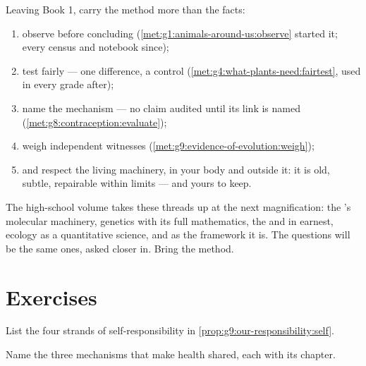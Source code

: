 \begin{method}\label{met:g9:our-responsibility:method}
Leaving Book 1, carry the method more than the facts:
\begin{enumerate}
  \item observe before concluding
        (\cref{met:g1:animals-around-us:observe} started
        it; every census and notebook since);
  \item test fairly --- one difference, a control
        (\cref{met:g4:what-plants-need:fairtest}, used in
        every grade after);
  \item name the mechanism --- no claim audited until its
        link is named
        (\cref{met:g8:contraception:evaluate});
  \item weigh independent witnesses
        (\cref{met:g9:evidence-of-evolution:weigh});
  \item and respect the living machinery, in your body
        and outside it: it is old, subtle, repairable
        within limits --- and yours to keep.
\end{enumerate}
\end{method}

\begin{remark}\label{rem:g9:our-responsibility:next}
The high-school volume takes these threads up at the next
magnification: the 's molecular machinery, genetics
with its full mathematics, the  and 
in earnest, ecology as a quantitative science, and
 as the framework it is. The questions will be
the same ones, asked closer in. Bring the method.
\end{remark}

\section{Exercises}

\begin{exercise}[$\star$]\label{exo:g9:our-responsibility:1}
List the four strands of self-responsibility in
\cref{prop:g9:our-responsibility:self}.
\end{exercise}

\begin{exercise}[$\star$]\label{exo:g9:our-responsibility:2}
Name the three mechanisms that make health shared, each
with its chapter.
\end{exercise}

